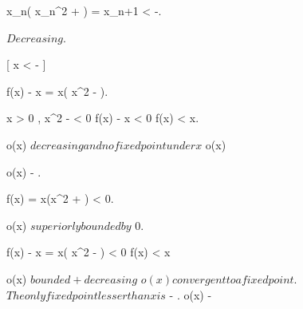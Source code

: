 \documentclass[../Main/main]{subfiles}
\begin{document}
{{{{		

			\imp x_n( x_n^2 + ) = x_{n+1} < -.

			$ Decreasing $.

			[ x < - ]
			{
				f(x) - x = x( x^2 - ).

				x > 0 , x^2 -  < 0 \imp f(x) - x < 0 \imp f(x) < x.
			}

			o(x) $ decreasing and no fixed point under x $ \imp o(x) \convergesto \infty




			{
				o(x) \convergesto - .

				f(x) = x(x^2 + ) < 0.

				o(x) $ superiorly bounded by $ 0.

				f(x) - x = x( x^2 -  ) < 0 \imp f(x) < x

				o(x) $ bounded + decreasing $ \imp $ o(x) convergent to a fixed point$.
				$ The only fixed point lesser than x is $ - . o(x) \convergesto - 
			}
		}
	}
}
}
\end{document}
